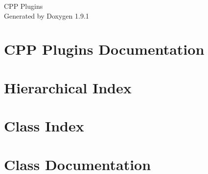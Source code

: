 \let\mypdfximage\pdfximage\def\pdfximage{\immediate\mypdfximage}\documentclass[twoside]{book}
\newcommand{\+}{\discretionary{\mbox{\scriptsize$\hookleftarrow$}}{}{}}
\newcommand{\clearemptydoublepage}{%
  \newpage{\pagestyle{empty}\cleardoublepage}%
}
\begin{document}
\raggedbottom

\hypersetup{pageanchor=false,
             bookmarksnumbered=true,
             pdfencoding=unicode
            }
\begin{titlepage}
\vspace*{7cm}
\begin{center}%
{\Large CPP Plugins }\\
\vspace*{1cm}
{\large Generated by Doxygen 1.9.1}\\
\end{center}
\end{titlepage}
\clearemptydoublepage
{}
\tableofcontents
\clearemptydoublepage
{}
\hypersetup{pageanchor=true}

\chapter{CPP Plugins Documentation}
\label{index}\hypertarget{index}{}
\chapter{Hierarchical Index}

\chapter{Class Index}

\chapter{Class Documentation}





\backmatter
\newpage
{}
\clearemptydoublepage
{}
\printindex
\end{document}

